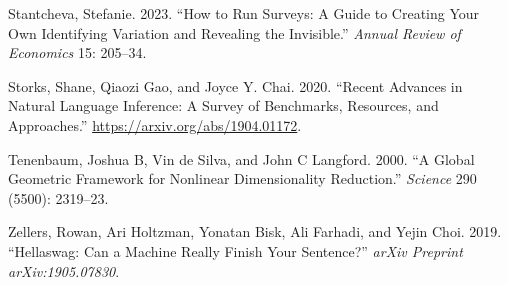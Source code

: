 \documentclass[
]{article}
\newlength{\cslhangindent}
\newenvironment{CSLReferences}[2] %
 {\begin{list}{}{%
  \setlength{\itemindent}{0pt}
  \setlength{\leftmargin}{0pt}
  \setlength{\parsep}{0pt}
  \ifodd #1
   \setlength{\leftmargin}{\cslhangindent}
   \setlength{\itemindent}{-1\cslhangindent}
  \fi
  \setlength{\itemsep}{#2\baselineskip}}}
 {\end{list}}
\begin{document}
\begin{CSLReferences}{1}{0}
Stantcheva, Stefanie. 2023. {``How to Run Surveys: A Guide to Creating
Your Own Identifying Variation and Revealing the Invisible.''}
\emph{Annual Review of Economics} 15: 205--34.

Storks, Shane, Qiaozi Gao, and Joyce Y. Chai. 2020. {``Recent Advances
in Natural Language Inference: A Survey of Benchmarks, Resources, and
Approaches.''} \url{https://arxiv.org/abs/1904.01172}.

Tenenbaum, Joshua B, Vin de Silva, and John C Langford. 2000. {``A
Global Geometric Framework for Nonlinear Dimensionality Reduction.''}
\emph{Science} 290 (5500): 2319--23.

Zellers, Rowan, Ari Holtzman, Yonatan Bisk, Ali Farhadi, and Yejin Choi.
2019. {``Hellaswag: Can a Machine Really Finish Your Sentence?''}
\emph{arXiv Preprint arXiv:1905.07830}.

\end{CSLReferences}
\end{document}
